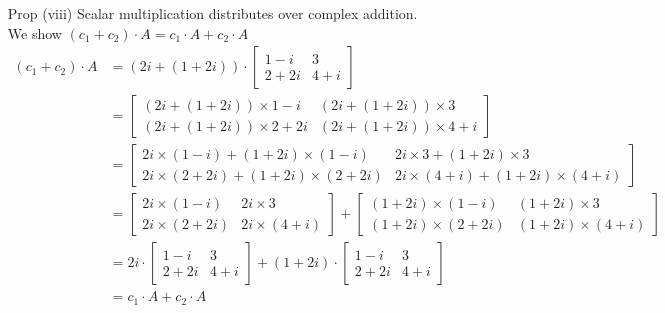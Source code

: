 \documentclass[11pt]{article}
\begin{document}
\begin{enumerate}
		\item[Prop (viii)] Scalar multiplication distributes over complex addition. \\
			We show $(c_1 + c_2) \cdot A = c_1 \cdot A + c_2 \cdot A$
			\begin{align*}
                                (c_1 + c_2) \cdot A 
                                &= (2i + (1+2i)) \cdot 
                                \begin{bmatrix}1 - i & 3 \\ 2+2i & 4+i  \end{bmatrix} \\
                                &=   
                                \begin{bmatrix} 
                                (2i + (1+2i)) \times 1 - i & 
                                (2i + (1+2i)) \times 3 \\ 
                                (2i + (1+2i)) \times 2+2i & 
                                (2i + (1+2i)) \times 4+i  
                                \end{bmatrix} \\
                                &=   
                                \begin{bmatrix} 
                                2i \times (1-i) + (1+2i) \times (1-i) & 
                                2i \times 3 + (1+2i) \times 3 \\
                                2i \times (2+2i) + (1+2i) \times (2+2i) & 
                                2i \times (4+i) + (1+2i) \times (4+i) 
                                \end{bmatrix} \\
				&=
				\begin{bmatrix} 
                                2i \times (1-i)  & 
                                2i \times 3 \\
                                2i \times (2+2i)  & 
                                2i \times (4+i) 
                                \end{bmatrix} 
                                +
                                \begin{bmatrix}
                                	(1+2i) \times (1-i) &
                                	(1+2i) \times 3 \\
                                	(1+2i) \times (2+2i) &
                                	(1+2i) \times (4+i)
                                \end{bmatrix} \\
                                &= 2i \cdot \begin{bmatrix}1 - i & 3 \\ 2+2i & 4+i  \end{bmatrix}
                                	+ (1+2i) \cdot 
                                	\begin{bmatrix}1 - i & 3 \\ 2+2i & 4+i  \end{bmatrix} \\
                                &= c_1 \cdot A + c_2 \cdot A 
			\end{align*}
	\end{enumerate}
\end{document}
